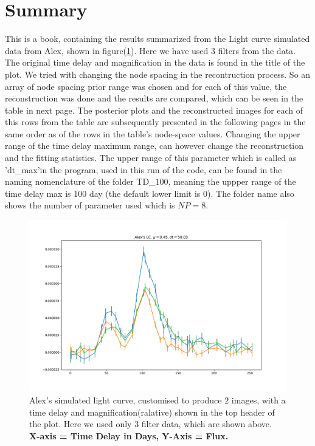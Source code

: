 \documentclass{article}
\begin{document}
\section*{Summary}
This is a book, containing the results summarized from the Light curve simulated data from Alex, shown in figure(\ref{A}). Here we have used $3$ filters from the data. The original time delay and magnification in the data is found in the title of the plot. We tried with changing the node spacing in the recontruction process. So an array of node spacing prior range was chosen and for each of this value, the reconstruction was done and the results are compared, which can be seen in the table in next page. The posterior plots and the reconstructed images for each of this rows from the table are subsequently presented in the following pages in the same order as of the rows in the table's node-space values.
Changing the upper range of the time delay maximum range, can however change the reconstruction and the fitting statistics. The upper range of this parameter which is called as 'dt\_max'in the program, used in this run of the code, can be found in the naming nomenclature of the folder TD\_$100$, meaning the uppper range of the time delay max is $100$ day (the default lower limit is $0$). The folder name also shows the number of parameter used which is $NP=8$. 
  

\begin{figure}[h!]
  \centering
    \includegraphics[width=\textwidth]{Alex_LC.pdf}
  \caption{Alex's simulated light curve, customised to produce $2$ images, with a time delay and magnification(ralative) shown in the top header of the plot. Here we used only $3$ filter data, which are shown above.\\\hspace{\textwidth}\textbf{X-axis = Time Delay in Days, Y-Axis = Flux.}}
  \label{A}
\end{figure}
\end{document}
